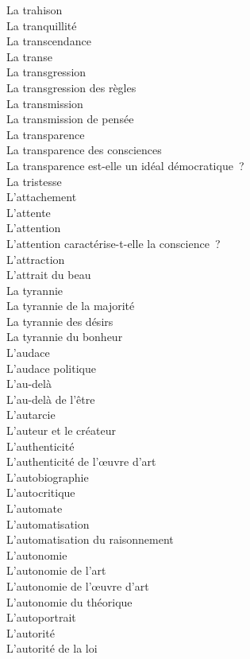 \documentclass[a4paper,12pt]{article}
\begin{document}
La trahison \\
La tranquillité \\
La transcendance \\
La transe \\
La transgression \\
La transgression des règles \\
La transmission \\
La transmission de pensée \\
La transparence \\
La transparence des consciences \\
La transparence est-elle un idéal démocratique ? \\
La tristesse \\
L'attachement \\
L'attente \\
L'attention \\
L'attention caractérise-t-elle la conscience ? \\
L'attraction \\
L'attrait du beau \\
La tyrannie \\
La tyrannie de la majorité \\
La tyrannie des désirs \\
La tyrannie du bonheur \\
L'audace \\
L'audace politique \\
L'au-delà \\
L'au-delà de l'être \\
L'autarcie \\
L'auteur et le créateur \\
L'authenticité \\
L'authenticité de l'œuvre d'art \\
L'autobiographie \\
L'autocritique \\
L'automate \\
L'automatisation \\
L'automatisation du raisonnement \\
L'autonomie \\
L'autonomie de l'art \\
L'autonomie de l'œuvre d'art \\
L'autonomie du théorique \\
L'autoportrait \\
L'autorité \\
L'autorité de la loi \\
\end{document}
